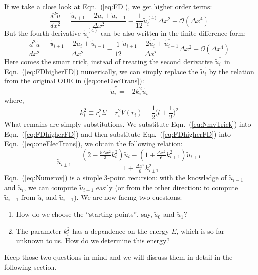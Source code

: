 If we take a close look at Eqn.~({\ref{eq:FD}}), we get higher order terms:
\begin{equation} \label{eq:FDhigher}
\frac{d^2\tilde{u}}{dx^2} = \frac{\tilde{u}_{i+1} - 2\tilde{u}_i + \tilde{u}_{i-1}}{\Delta x^2} - \frac{1}{12}\tilde{u}_i^{(4)}\Delta x^2 + \mathcal{O}(\Delta x^4)
\end{equation}
%
But the fourth derivative $\tilde{u}_i^{(4)}$ can be also written in the
finite-difference form:
\begin{equation} \label{eq:FDhigherFD}
\frac{d^2\tilde{u}}{dx^2} = \frac{\tilde{u}_{i+1} - 2\tilde{u}_i + \tilde{u}_{i-1}}{\Delta x^2} - \frac{1}{12}\frac{\tilde{u}_{i+1}^{''} - 2\tilde{u}_i^{''} + \tilde{u}_{i-1}^{''}}{\Delta x^2}\Delta x^2 + \mathcal{O}(\Delta x^4)
\end{equation}
%
Here comes the smart trick, instead of treating the second derivative $\tilde{u}_i^{''}$ in
Eqn.~(\ref{eq:FDhigherFD}) numerically, we can simply replace the $\tilde{u}_i^{''}$
by the relation from the original ODE in (\ref{eq:oneElecTrans}):
\begin{equation} \label{eq:NmvTrick}
\tilde{u}_i^{''} = -2 k_i^2 \tilde{u_i}
\end{equation}
where,
\begin{equation} \label{eq:kk}
k_i^2 \equiv r_i^2 E - r_i^2 V(r_i) - \frac{1}{2} \Big(l+\frac{1}{2}\Big)^2
\end{equation}
%
What remains are simply substitutions. We substitute Eqn.~(\ref{eq:NmvTrick}) into
Eqn.~(\ref{eq:FDhigherFD}) and then substitute Eqn.~(\ref{eq:FDhigherFD}) into
Eqn.~(\ref{eq:oneElecTrans}), we obtain the following relation:
\begin{equation} \label{eq:Numerov}
\boxed{\tilde{u}_{i\pm1} = \frac{(2-\frac{5\Delta x^2}{3}k_i^2)\tilde{u}_i - (1+\frac{\Delta x^2}{6}k_{i\mp1}^2)\tilde{u}_{i\mp1}}{1+\frac{\Delta x^2}{6}k_{i\pm1}^2}}
\end{equation}
%
Eqn.~(\ref{eq:Numerov}) is a simple 3-point recursion: with the knowledge of
$\tilde{u}_{i-1}$ and $\tilde{u}_i$, we can compute $\tilde{u}_{i+1}$ easily
(or from the other direction: to compute $\tilde{u}_{i-1}$ from $\tilde{u}_i$
and $\tilde{u}_{i+1}$).
We are now facing two questions:
\begin{enumerate}
  \item How do we choose the ``starting points'', say, $\tilde{u}_0$
        and $\tilde{u}_1$?
  \item The parameter $k_i^2$ has a dependence on the energy $E$, which is so far
        unknown to us. How do we determine this energy?
\end{enumerate}
Keep those two questions in mind and we will discuss them in detail in the
following section.

